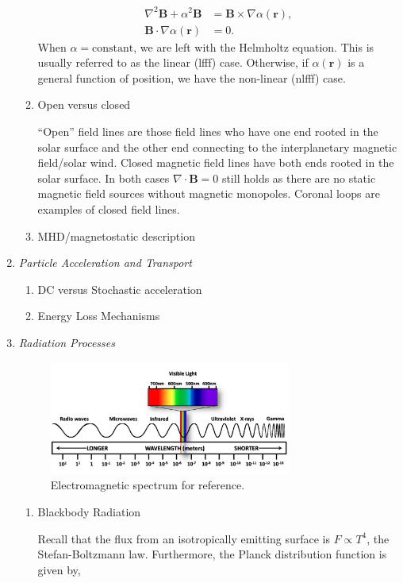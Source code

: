 \begin{enumerate}
\begin{enumerate}
				\begin{align}
					\nabla^2\mathbf{B}+\alpha^2\mathbf{B} &= \mathbf{B}\times\nabla\alpha(\mathbf{r}), \\
					\mathbf{B}\cdot\nabla\alpha(\mathbf{r}) &= 0.
				\end{align}
				When $\alpha=\mathrm{constant}$, we are left with the Helmholtz equation. This is usually referred to as the linear (lfff) case. Otherwise, if $\alpha(\mathbf{r})$ is a general function of position, we have the non-linear (nlfff) case.
				\item{Open versus closed}
				\par ``Open'' field lines are those field lines who have one end rooted in the solar surface and the other end connecting to the interplanetary magnetic field/solar wind. Closed magnetic field lines have both ends rooted in the solar surface. In both cases $\nabla\cdot\mathbf{B}=0$ still holds as there are no static magnetic field sources without magnetic monopoles. Coronal loops are examples of closed field lines.  
				\item{MHD/magnetostatic description}
			\end{enumerate}
			\item{\em Particle Acceleration and Transport}
			\begin{enumerate}
				\item{DC versus Stochastic acceleration}
				\item{Energy Loss Mechanisms}
			\end{enumerate}
			\item{\em Radiation Processes}
			\begin{figure}
				\centering
				\includegraphics[width=0.75\textwidth]{figures/em_spectrum.png}
				\caption{Electromagnetic spectrum for reference.}
			\end{figure}
			\begin{enumerate}
				\item{Blackbody Radiation}
				\par Recall that the flux from an isotropically emitting surface is $F\propto T^4$, the Stefan-Boltzmann law. Furthermore, the Planck distribution function is given by,

\end{enumerate}
\end{enumerate}
